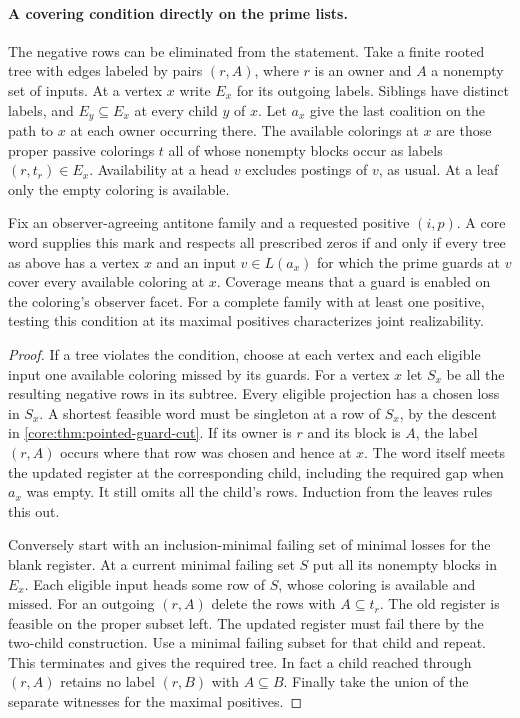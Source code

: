 \paragraph{A covering condition directly on the prime lists.}
The negative rows can be eliminated from the statement. Take a finite
rooted tree with edges labeled by pairs $(r,A)$, where $r$ is an owner
and $A$ a nonempty set of inputs. At a vertex $x$ write $E_x$ for
its outgoing labels. Siblings have distinct labels, and
$E_y\subseteq E_x$ at every child $y$ of $x$. Let $a_x$ give
the last coalition on the path to $x$ at each owner occurring there.
The available colorings at $x$ are those proper passive colorings
$t$ all of whose nonempty blocks occur as labels $(r,t_r)\in E_x$.
Availability at a head $v$ excludes postings of $v$, as usual.
At a leaf only the empty coloring is available.

\begin{theorem}
\label{core:thm:prime-tree-cover}
Fix an observer-agreeing antitone family and a requested positive
$(i,p)$. A core word supplies this mark and respects all prescribed
zeros if and only if every tree as above has a vertex $x$ and an
input $v\in L(a_x)$ for which the prime guards at $v$ cover every
available coloring at $x$. Coverage means that a guard is enabled on
the coloring's observer facet. For a complete family with at least
one positive, testing this condition at its maximal positives
characterizes joint realizability.
\end{theorem}
\begin{proof}
If a tree violates the condition, choose at each vertex and each
eligible input one available coloring missed by its guards. For a
vertex $x$ let $S_x$ be all the resulting negative rows in its
subtree. Every eligible projection has a chosen loss in $S_x$. A shortest
feasible word must be singleton at a row of $S_x$, by the descent in
\cref{core:thm:pointed-guard-cut}. If its owner is $r$ and its block
is $A$, the label $(r,A)$ occurs where that row was chosen and hence
at $x$. The word itself meets the updated register at the
corresponding child, including the required gap when $a_x$ was
empty. It still omits all the child's rows. Induction from the
leaves rules this out.

Conversely start with an inclusion-minimal failing set of minimal
losses for the blank register. At a current minimal failing set
$S$ put all its nonempty blocks in $E_x$. Each eligible input
heads some row of $S$, whose coloring is available and missed.
For an outgoing $(r,A)$ delete the rows with $A\subseteq t_r$.
The old register is feasible on the proper subset left. The updated
register must fail there by the two-child construction. Use a
minimal failing subset for that child and repeat. This terminates
and gives the required tree. In fact a child reached through $(r,A)$
retains no label $(r,B)$ with $A\subseteq B$. Finally take the
union of the separate witnesses for the maximal positives.
\end{proof}

